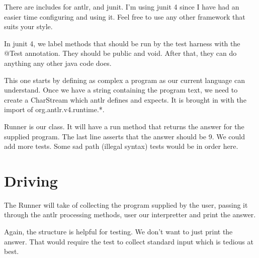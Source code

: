 There are includes for antlr, and junit. I'm using junit 4 since I have
had an easier time configuring and using it. Feel free to use any
other framework that suits your style.

In junit 4, we label methods that should be run by the test harness
with the @Test annotation. They should be public and void. After that,
they can do anything any other java code does.

This one starts by defining as complex a program as our current language
can understand. Once we have a string containing the program text, we
need to create a CharStream which antlr defines and expects. It is
brought in with the import of org.antlr.v4.runtime.*.

Runner is our class. It will have a run method that returns the answer
for the supplied program. The last line asserts that the answer should be 9.
We could add more tests. Some sad path (illegal syntax) tests would
be in order here.

\section{Driving}

The Runner will take of collecting the program supplied by the user,
passing it through the antlr processing methods, user our interpretter
and print the answer.

Again, the structure is helpful for testing. We don't want to just print
the answer. That would require the test to collect standard input which
is tedious at best.


